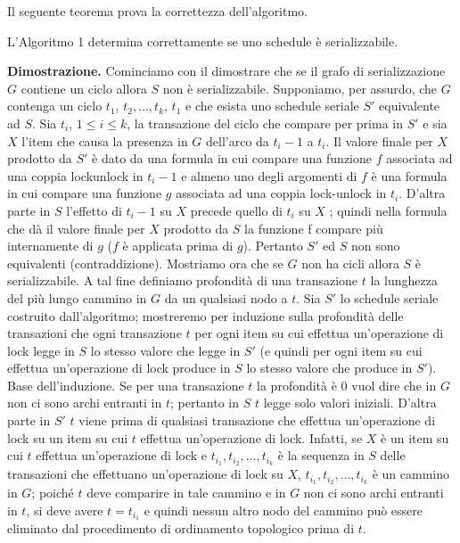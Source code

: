 Il seguente teorema prova la correttezza dell'algoritmo.
\label{teorema_6_1}
\begin{theo}
L'Algoritmo 1 determina correttamente se uno schedule è serializzabile. 
\end{theo}
\textbf{Dimostrazione.} Cominciamo con il dimostrare che se il grafo di serializzazione $G$ contiene un ciclo allora $S$
non è serializzabile. Supponiamo, per assurdo, che $G$ contenga un ciclo $t_1$, $t_2, \ldots, t_k$, $t_1$ e che
esista uno schedule seriale $S'$ equivalente ad $S$. Sia $t_i$, $1\leq i \leq k$, la transazione del ciclo che compare
per prima in $S'$ e sia $X$ l'item che causa la presenza in $G$ dell'arco da $t_i-1$ a $t_i$. Il valore finale per $X$
prodotto da $S'$ è dato da una formula in cui compare una funzione $f$ associata ad una coppia lockunlock
in $t_i-1$ e almeno uno degli argomenti di $f$ è una formula in cui compare una funzione $g$
associata ad una coppia lock-unlock in $t_i$. D'altra parte in $S$ l'effetto di $t_i-1$ su $X$ precede quello di $t_i$
su $X$ ; quindi nella formula che dà il valore finale per $X$ prodotto da $S$ la funzione f compare più
internamente di $g$ ($f$ è applicata prima di $g$). Pertanto $S'$ ed $S$ non sono equivalenti (contraddizione).
Mostriamo ora che se $G$ non ha cicli allora $S$ è serializzabile. A tal fine definiamo profondità di una
transazione $t$ la lunghezza del più lungo cammino in $G$ da un qualsiasi nodo a $t$.
Sia $S'$ lo schedule seriale costruito dall'algoritmo; mostreremo per induzione sulla profondità delle
transazioni che ogni transazione $t$ per ogni item su cui effettua un'operazione di lock legge in $S$ lo
stesso valore che legge in $S'$ (e quindi per ogni item su cui effettua un'operazione di lock produce in
$S$ lo stesso valore che produce in $S'$).
Base dell'induzione. Se per una transazione $t$ la profondità è 0 vuol dire che in $G$ non ci sono archi
entranti in $t$; pertanto in $S$ $t$ legge solo valori iniziali. D'altra parte in $S'$ $t$ viene prima di qualsiasi
transazione che effettua un'operazione di lock su un item su cui $t$ effettua un'operazione di lock.
Infatti, se $X$ è un item su cui $t$ effettua un'operazione di lock e $t_{i_1}, t_{i_2}, \ldots, t_{i_k}$ è la sequenza in $S$
delle transazioni che effettuano un'operazione di lock su $X$, $t_{i_1}, t_{i_2}, \ldots, t_{i_k}$ è un cammino in $G$;
poiché $t$ deve comparire in tale cammino e in $G$ non ci sono archi entranti in $t$, si deve avere $t=t_{i_1}$
e quindi nessun altro nodo del cammino può essere eliminato dal procedimento di ordinamento
topologico prima di $t$.
